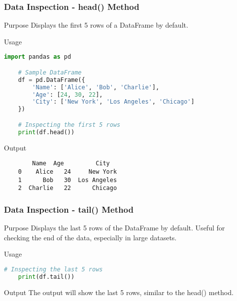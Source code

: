 \documentclass[aspectratio=169]{beamer}
\begin{document}
\begin{frame}[fragile]
    \frametitle{Data Inspection - head() Method}
    \begin{block}{Purpose}
        Displays the first 5 rows of a DataFrame by default.
    \end{block}
    \begin{block}{Usage}
    \begin{lstlisting}[language=python]
    import pandas as pd

    # Sample DataFrame
    df = pd.DataFrame({
        'Name': ['Alice', 'Bob', 'Charlie'],
        'Age': [24, 30, 22],
        'City': ['New York', 'Los Angeles', 'Chicago']
    })

    # Inspecting the first 5 rows
    print(df.head())
    \end{lstlisting}
    \end{block}
    \begin{block}{Output}
    \begin{verbatim}
        Name  Age         City
    0    Alice   24     New York
    1      Bob   30  Los Angeles
    2  Charlie   22      Chicago
    \end{verbatim}
    \end{block}
\end{frame}

\begin{frame}[fragile]
    \frametitle{Data Inspection - tail() Method}
    \begin{block}{Purpose}
        Displays the last 5 rows of the DataFrame by default. Useful for checking the end of the data, especially in large datasets.
    \end{block}
    \begin{block}{Usage}
    \begin{lstlisting}[language=python]
    # Inspecting the last 5 rows
    print(df.tail())
    \end{lstlisting}
    \end{block}
    \begin{block}{Output}
    The output will show the last 5 rows, similar to the head() method.
    \end{block}
\end{frame}
\end{document}
